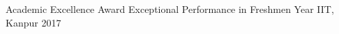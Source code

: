 \begin{cvhonors}

  \cvhonor
  {Academic Excellence Award}
  {Exceptional Performance in Freshmen Year}
  {IIT, Kanpur}
  {2017}



\end{cvhonors}

